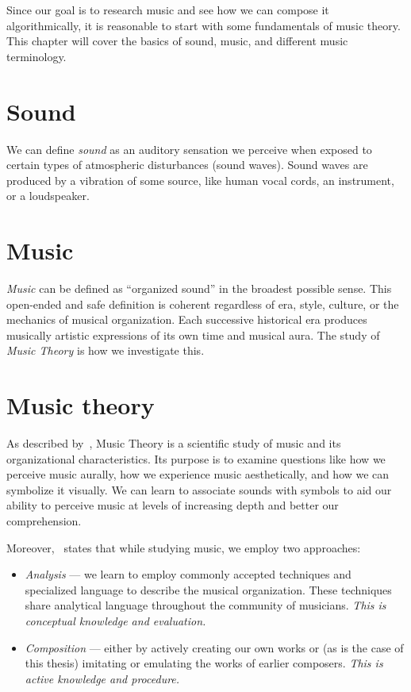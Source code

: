
\begin{chapterabstract}
    Since our goal is to research music and see how we can compose it algorithmically, it is reasonable to start with some fundamentals of music theory.
    This chapter will cover the basics of sound, music, and different music terminology.
\end{chapterabstract}


\section{Sound}\label{sec:sound}

We can define \textit{sound} as an auditory sensation we perceive when exposed to certain types of atmospheric disturbances (sound waves).
Sound waves are produced by a vibration of some source, like human vocal cords, an instrument, or a loudspeaker.~\cite{sound}


\section{Music}\label{sec:music}

\textit{Music} can be defined as ``organized sound'' in the broadest possible sense.
This open-ended and safe definition is coherent regardless of era, style, culture, or the mechanics of musical organization.
Each successive historical era produces musically artistic expressions of its own time and musical aura.
The study of \textit{Music Theory} is how we investigate this.~\cite{music-theory-andrew}


\section{Music theory}\label{sec:music-theory}

As described by~\cite{music-theory-andrew}, Music Theory is a scientific study of music and its organizational characteristics.
Its purpose is to examine questions like how we perceive music aurally, how we experience music aesthetically, and how we can symbolize it visually.
We can learn to associate sounds with symbols to aid our ability to perceive music at levels of increasing depth and better our comprehension.

Moreover,~\cite{music-theory-andrew} states that while studying music, we employ two approaches:
\begin{itemize}
    \item \textit{Analysis} — we learn to employ commonly accepted techniques and specialized language to describe the musical organization.
    These techniques share analytical language throughout the community of musicians.
    \textit{This is conceptual knowledge and evaluation.}
    \item \textit{Composition} — either by actively creating our own works or (as is the case of this thesis) imitating or emulating the works of earlier composers.
    \textit{This is active knowledge and procedure.}
\end{itemize}


